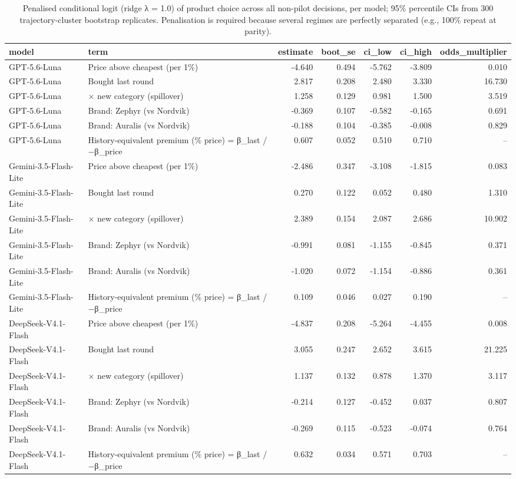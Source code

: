 \begin{table}[htbp]
\centering
\scriptsize
\caption{Penalised conditional logit (ridge λ = 1.0) of product choice across all non-pilot decisions, per model; 95\% percentile CIs from 300 trajectory-cluster bootstrap replicates. Penalisation is required because several regimes are perfectly separated (e.g., 100\% repeat at parity).}
\label{tab:tab18_choice_model_coefficients}
\begin{tabular}{llrrrrr}
\toprule
model & term & estimate & boot\_se & ci\_low & ci\_high & odds\_multiplier \\
\midrule
GPT-5.6-Luna & Price above cheapest (per 1\%) & -4.640 & 0.494 & -5.762 & -3.809 & 0.010 \\
GPT-5.6-Luna & Bought last round & 2.817 & 0.208 & 2.480 & 3.330 & 16.730 \\
GPT-5.6-Luna & × new category (spillover) & 1.258 & 0.129 & 0.981 & 1.500 & 3.519 \\
GPT-5.6-Luna & Brand: Zephyr (vs Nordvik) & -0.369 & 0.107 & -0.582 & -0.165 & 0.691 \\
GPT-5.6-Luna & Brand: Auralis (vs Nordvik) & -0.188 & 0.104 & -0.385 & -0.008 & 0.829 \\
GPT-5.6-Luna & History-equivalent premium (\% price) = β\_last / −β\_price & 0.607 & 0.052 & 0.510 & 0.710 & -- \\
Gemini-3.5-Flash-Lite & Price above cheapest (per 1\%) & -2.486 & 0.347 & -3.108 & -1.815 & 0.083 \\
Gemini-3.5-Flash-Lite & Bought last round & 0.270 & 0.122 & 0.052 & 0.480 & 1.310 \\
Gemini-3.5-Flash-Lite & × new category (spillover) & 2.389 & 0.154 & 2.087 & 2.686 & 10.902 \\
Gemini-3.5-Flash-Lite & Brand: Zephyr (vs Nordvik) & -0.991 & 0.081 & -1.155 & -0.845 & 0.371 \\
Gemini-3.5-Flash-Lite & Brand: Auralis (vs Nordvik) & -1.020 & 0.072 & -1.154 & -0.886 & 0.361 \\
Gemini-3.5-Flash-Lite & History-equivalent premium (\% price) = β\_last / −β\_price & 0.109 & 0.046 & 0.027 & 0.190 & -- \\
DeepSeek-V4.1-Flash & Price above cheapest (per 1\%) & -4.837 & 0.208 & -5.264 & -4.455 & 0.008 \\
DeepSeek-V4.1-Flash & Bought last round & 3.055 & 0.247 & 2.652 & 3.615 & 21.225 \\
DeepSeek-V4.1-Flash & × new category (spillover) & 1.137 & 0.132 & 0.878 & 1.370 & 3.117 \\
DeepSeek-V4.1-Flash & Brand: Zephyr (vs Nordvik) & -0.214 & 0.127 & -0.452 & 0.037 & 0.807 \\
DeepSeek-V4.1-Flash & Brand: Auralis (vs Nordvik) & -0.269 & 0.115 & -0.523 & -0.074 & 0.764 \\
DeepSeek-V4.1-Flash & History-equivalent premium (\% price) = β\_last / −β\_price & 0.632 & 0.034 & 0.571 & 0.703 & -- \\
\bottomrule
\end{tabular}
\end{table}